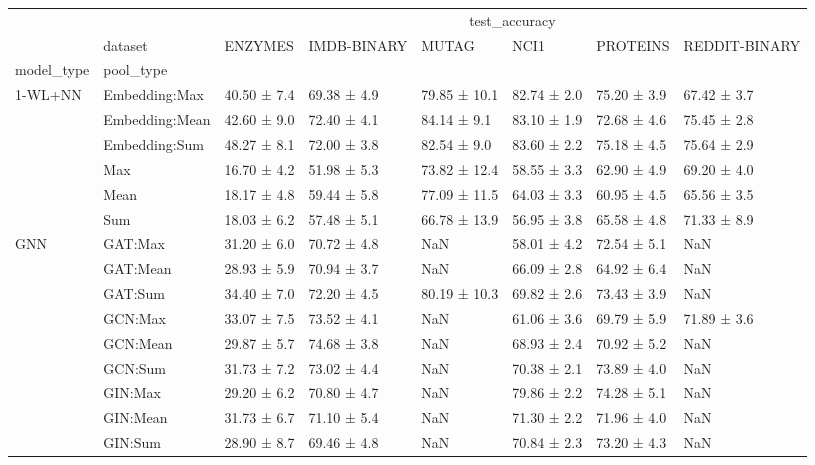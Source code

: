 \begin{tabular}{llllllll}
\toprule
 &  & \multicolumn{6}{c}{test\_accuracy} \\
 & dataset & ENZYMES & IMDB-BINARY & MUTAG & NCI1 & PROTEINS & REDDIT-BINARY \\
model_type & pool_type &  &  &  &  &  &  \\
\midrule
\multirow[t]{6}{*}{1-WL+NN} & Embedding:Max & 40.50 ± 7.4 & 69.38 ± 4.9 & 79.85 ± 10.1 & 82.74 ± 2.0 & 75.20 ± 3.9 & 67.42 ± 3.7 \\
 & Embedding:Mean & 42.60 ± 9.0 & 72.40 ± 4.1 & 84.14 ± 9.1 & 83.10 ± 1.9 & 72.68 ± 4.6 & 75.45 ± 2.8 \\
 & Embedding:Sum & 48.27 ± 8.1 & 72.00 ± 3.8 & 82.54 ± 9.0 & 83.60 ± 2.2 & 75.18 ± 4.5 & 75.64 ± 2.9 \\
 & Max & 16.70 ± 4.2 & 51.98 ± 5.3 & 73.82 ± 12.4 & 58.55 ± 3.3 & 62.90 ± 4.9 & 69.20 ± 4.0 \\
 & Mean & 18.17 ± 4.8 & 59.44 ± 5.8 & 77.09 ± 11.5 & 64.03 ± 3.3 & 60.95 ± 4.5 & 65.56 ± 3.5 \\
 & Sum & 18.03 ± 6.2 & 57.48 ± 5.1 & 66.78 ± 13.9 & 56.95 ± 3.8 & 65.58 ± 4.8 & 71.33 ± 8.9 \\
\cline{1-8}
\multirow[t]{9}{*}{GNN} & GAT:Max & 31.20 ± 6.0 & 70.72 ± 4.8 & NaN & 58.01 ± 4.2 & 72.54 ± 5.1 & NaN \\
 & GAT:Mean & 28.93 ± 5.9 & 70.94 ± 3.7 & NaN & 66.09 ± 2.8 & 64.92 ± 6.4 & NaN \\
 & GAT:Sum & 34.40 ± 7.0 & 72.20 ± 4.5 & 80.19 ± 10.3 & 69.82 ± 2.6 & 73.43 ± 3.9 & NaN \\
 & GCN:Max & 33.07 ± 7.5 & 73.52 ± 4.1 & NaN & 61.06 ± 3.6 & 69.79 ± 5.9 & 71.89 ± 3.6 \\
 & GCN:Mean & 29.87 ± 5.7 & 74.68 ± 3.8 & NaN & 68.93 ± 2.4 & 70.92 ± 5.2 & NaN \\
 & GCN:Sum & 31.73 ± 7.2 & 73.02 ± 4.4 & NaN & 70.38 ± 2.1 & 73.89 ± 4.0 & NaN \\
 & GIN:Max & 29.20 ± 6.2 & 70.80 ± 4.7 & NaN & 79.86 ± 2.2 & 74.28 ± 5.1 & NaN \\
 & GIN:Mean & 31.73 ± 6.7 & 71.10 ± 5.4 & NaN & 71.30 ± 2.2 & 71.96 ± 4.0 & NaN \\
 & GIN:Sum & 28.90 ± 8.7 & 69.46 ± 4.8 & NaN & 70.84 ± 2.3 & 73.20 ± 4.3 & NaN \\
\cline{1-8}
\bottomrule
\end{tabular}
